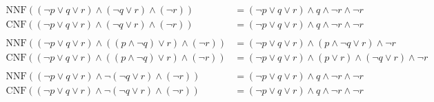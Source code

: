 \begin{align}
  \mathrm{NNF}((\neg p \vee q \vee r)\wedge(\neg q \vee r)\wedge(\neg r)) &= (\neg p \vee q \vee r) \wedge q \wedge \neg r \wedge \neg r  \label{eq:1convertnnf}\\
  \mathrm{CNF}((\neg p \vee q \vee r)\wedge(\neg q \vee r)\wedge(\neg r)) &= (\neg p \vee q \vee r) \wedge q \wedge \neg r \wedge \neg r  \label{eq:1convertcnf}\\
  \nonumber \\
  \mathrm{NNF}((\neg p \vee q \vee r)\wedge((p\wedge\neg q) \vee r)\wedge(\neg r)) &= (\neg p \vee q \vee r) \wedge (p \wedge \neg q \vee r) \wedge \neg r          \label{eq:2convertnnf}\\
  \mathrm{CNF}((\neg p \vee q \vee r)\wedge((p\wedge\neg q) \vee r)\wedge(\neg r)) &= (\neg p \vee q \vee r) \wedge (p \vee r) \wedge (\neg q \vee r) \wedge \neg r \label{eq:2convertcnf}\\
  \nonumber \\
  \mathrm{NNF}((\neg p \vee q \vee r)\wedge\neg (\neg q \vee r)\wedge(\neg r)) &= (\neg p \vee q \vee r) \wedge q \wedge \neg r \wedge \neg r          \label{eq:3convertnnf} \\
  \mathrm{CNF}((\neg p \vee q \vee r)\wedge\neg (\neg q \vee r)\wedge(\neg r)) &= (\neg p \vee q \vee r) \wedge q \wedge \neg r \wedge \neg r          \label{eq:3convertcnf}
\end{align}






